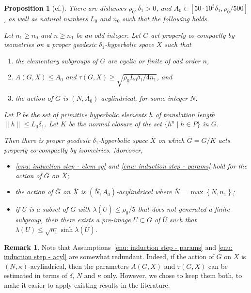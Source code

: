 \documentclass[11pt]{article}
\newcommand{\cf}{cf.\xspace}
\theoremstyle{plain}
\newtheorem{prop}[thm]{Proposition}
\theoremstyle{definition}
\newtheorem{rem}[thm]{Remark}
\newcommand{\q}[1]{\overline{#1}}
\begin{document}
\begin{prop}[\cf {\cite[Prop.\,6.18]{coulon_geometry_2014}}]\label{P: induction step}
There are distances $\rho_0,\delta_1> 0$, and $A_0 \in [50 \cdot 10^3\delta_1, \rho_0/500]$, as well as natural numbers $L_0$ and $n_0$ such that the following holds.

Let $n_1 \geq n_0$ and $n \geq n_1$ be an odd integer.
Let $G$ act properly co-compactly by isometries on a proper geodesic $\delta_1$-hyperbolic space $X$ such that
\begin{enumerate}
\item \label{enu: induction step - elem sg}
the elementary subgroups of $G$ are cyclic or finite of odd order $n$,
\item \label{enu: induction step - params}
$A(G,X)\leqslant A_0$ and $\tau(G,X)\geqslant \sqrt{\rho_0 L_0 \delta_1/4n_1}$, and
\item \label{enu: induction step - acyl}
the action of $G$ is $(N,A_0)$-acylindrical, for some integer $N$.
\end{enumerate}
Let $P$ be the set of primitive hyperbolic elements $h$ of translation length $\|h\|\leqslant L_0 \delta_1$. Let $K$ be the normal closure of the set $\{h^n\mid h\in P\}$ in $G$.

Then there is proper geodesic $\delta_1$-hyperbolic space $\overline{X}$ on which $\overline{G}=G/K$ acts properly co-compactly by isometries. Moreover,
\begin{itemize}
\item \eqref{enu: induction step - elem sg} and \eqref{enu: induction step - params} hold for the action of $\overline{G}$ on $\overline{X}$;
\item the action of $\q G$ on $\q X$ is $(\q N, A_0)$-acylindrical where $\q N = \max\left\{N, n_1\right\}$;
\item if $\q U$ is a subset of $\q G$ with $\lambda(\q U) \leq \rho_0/5$ that does not generated a finite subgroup, then there exists a pre-image $U \subset G$ of $\q U$ such that $\lambda(U) \leq \sqrt{n_1} \sinh \lambda(\q U)$.
\end{itemize}
\end{prop}

\begin{rem}
Note that Assumptions~\eqref{enu: induction step - params} and \eqref{enu: induction step - acyl} are somewhat redundant.
Indeed, if the action of $G$ on $X$ is $(N,\kappa)$-acylindrical, then the parameters $A(G,X)$ and $\tau(G,X)$ can be estimated in terms of $\delta$, $N$ and $\kappa$ only.
However, we chose to keep them both, to make it easier to apply existing results in the literature.
\end{rem}
\end{document}

